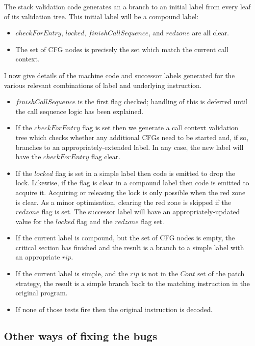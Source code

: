 The stack validation code generates an a branch to an initial label
from every leaf of its validation tree.  This initial label will be
a compound label:

\begin{itemize}
\item $checkForEntry$, $locked$, $finishCallSequence$, and $redzone$
  are all clear.
\item The set of CFG nodes is precisely the set which match the
  current call context.
\end{itemize}

I now give details of the machine code and successor labels generated
for the various relevant combinations of label and underlying
instruction.

\begin{itemize}
\item $finishCallSequence$ is the first flag checked; handling of this
  is deferred until the call sequence logic has been explained.
\item
  If the $checkForEntry$ flag is set then we generate a call context
  validation tree which checks whether any additional CFGs need to be
  started and, if so, branches to an appropriately-extended label.  In
  any case, the new label will have the $checkForEntry$ flag clear.
\item
  If the $locked$ flag is set in a simple label then code is emitted
  to drop the lock.  Likewise, if the flag is clear in a compound
  label then code is emitted to acquire it.  Acquiring or releasing
  the lock is only possible when the red zone is clear.  As a minor
  optimisation, clearing the red zone is skipped if the $redzone$ flag
  is set.  The successor label will have an appropriately-updated
  value for the $locked$ flag and the $redzone$ flag set.
\item
  If the current label is compound, but the set of CFG nodes is empty,
  the critical section has finished and the result is a branch to a
  simple label with an appropriate $rip$.
\item
  If the current label is simple, and the $rip$ is not in the $Cont$
  set of the patch strategy, the result is a simple branch back to the
  matching instruction in the original program.
\item
  If none of those tests fire then the original instruction is
  decoded.
\end{itemize}
  
\subsection{Other ways of fixing the bugs}

